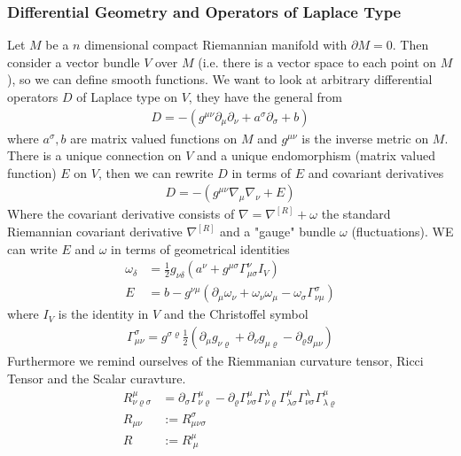 \subsubsection{Differential Geometry and Operators of Laplace Type}
Let $M$ be a $n$ dimensional compact Riemannian manifold with $\partial M = 0$.
Then consider a vector bundle $V$ over $M$ (i.e. there is a vector space to
each point on $M$), so we can define smooth functions. We want to look at
arbitrary differential operators $D$ of Laplace type on $V$, they have the general
from
\begin{align}
    D = -(g^{\mu\nu} \partial_\mu\partial_\nu + a^\sigma\partial_\sigma +b)
\end{align}
where $a^\sigma, b$ are matrix valued functions on $M$ and $g^{\mu\nu}$ is the
inverse metric on $M$. There is a unique connection on $V$ and a unique
endomorphism (matrix valued function) $E$ on $V$, then we can rewrite $D$ in
terms of $E$ and covariant derivatives
\begin{align}
    D = -(g^{\mu\nu} \nabla_\mu \nabla_\nu +E)
\end{align}
Where the covariant derivative consists of $\nabla = \nabla^{[R]} +\omega$ the
standard Riemannian covariant derivative $\nabla^{[R]}$ and a "gauge" bundle
$\omega$ (fluctuations). WE can write $E$ and $\omega$ in terms of geometrical
identities
\begin{align}
    \omega_\delta &= \frac{1}{2}g_{\nu\delta}(a^\nu
    +g^{\mu\sigma}\Gamma^\nu_{\mu\sigma}I_V)\\
    E &= b - g^{\nu\mu}(\partial_\mu \omega_\nu + \omega_\nu \omega_\mu -
    \omega_\sigma \Gamma^\sigma_{\nu\mu})
\end{align}
where $I_V$ is the identity in $V$ and the Christoffel symbol
\begin{align}
    \Gamma^\sigma_{\mu\nu} = g^{\sigma\varrho} \frac{1}{2} (\partial_\mu
    g_{\nu\varrho} + \partial_\nu g_{\mu\varrho} - \partial_\varrho g_{\mu\nu})
\end{align}
Furthermore we remind ourselves of the Riemmanian curvature tensor, Ricci
Tensor and the Scalar curavture.
\begin{align}
    R^\mu_{\nu\varrho\sigma} &= \partial_\sigma \Gamma^{\mu}_{\nu\varrho}
    -\partial_\varrho \Gamma^\mu_{\nu\sigma}
    \Gamma^{\lambda}_{\nu\varrho}\Gamma^{\mu}_{\lambda\sigma}
    \Gamma^{\lambda}_{\nu\sigma}\Gamma^{\mu}_{\lambda\varrho}\\
    R_{\mu\nu} &:= R^{\sigma}_{\mu\nu\sigma}\\
    R &:= R^\mu_{\ \mu}
\end{align}

